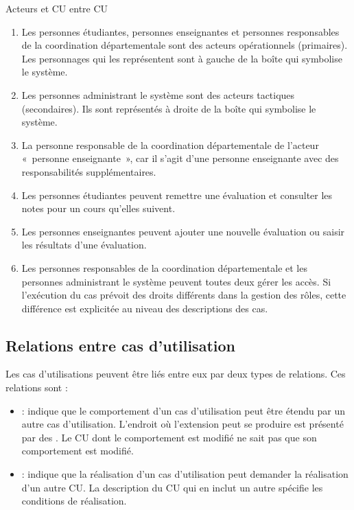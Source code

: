 \begin{exemple}[label={ex:acteurs-cu}]{Acteurs et CU entre \acrshort{CU}}
	\begin{enumerate}
		\item Les personnes étudiantes, personnes enseignantes et personnes responsables de la coordination départementale sont des acteurs opérationnels (primaires). Les personnages qui les représentent sont à gauche de la boîte qui symbolise le système. 
		\item Les personnes administrant le système sont des acteurs tactiques (secondaires). Ils sont représentés à droite de la boîte qui symbolise le système.
		\item La personne responsable de la coordination départementale  de l'acteur «~personne enseignante~», car il s'agit d'une personne enseignante avec des responsabilités supplémentaires.
		\item Les personnes étudiantes peuvent remettre une évaluation et consulter les notes pour un cours qu'elles suivent.
		\item Les personnes enseignantes peuvent ajouter une nouvelle évaluation ou saisir les résultats d'une évaluation.
		\item Les personnes responsables de la coordination départementale et les personnes administrant le système peuvent toutes deux gérer les accès. Si l'exécution du cas prévoit des droits différents dans la gestion des rôles, cette différence est explicitée au niveau des descriptions des cas.
	\end{enumerate}
	
\end{exemple}

\subsection{Relations entre cas d'utilisation}

Les cas d'utilisations peuvent être liés entre eux par deux types de relations. Ces relations sont :

\begin{itemize}
	\item {}  : indique que le comportement d'un cas d'utilisation peut être étendu par un autre cas d'utilisation. L'endroit où l'extension peut se produire est présenté par des .  Le \acrshort{CU} dont le comportement est modifié ne sait pas que son comportement est modifié.
	\item {}  : indique que la réalisation d'un cas d'utilisation peut demander la réalisation d'un autre \acrshort{CU}. La description du \acrshort{CU} qui en inclut un autre spécifie les conditions de réalisation.
\end{itemize}

